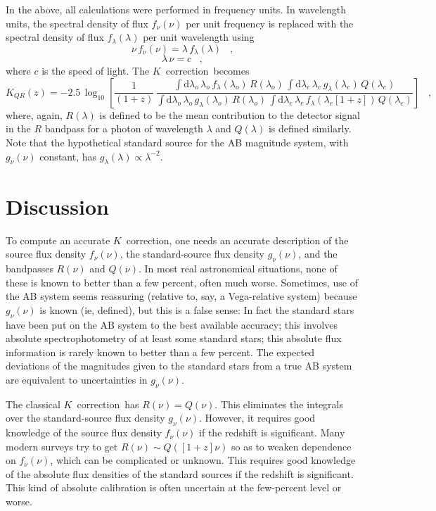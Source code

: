 \documentclass[preprint]{aastex}
\newcommand{\kcorrection}{$K$~correction}
\newcommand{\lambdaobs}{\lambda_o}
\newcommand{\lambdaemit}{\lambda_e}
\begin{document}
In the above, all calculations were performed in frequency units.  In
wavelength units, the spectral density of flux $f_{\nu}(\nu)$ per unit
frequency is replaced with the spectral density of flux
$f_{\lambda}(\lambda)$ per unit wavelength using
\begin{equation}
\nu\,f_{\nu}(\nu) = \lambda\,f_{\lambda}(\lambda) \;\;\;,
\end{equation}
\begin{equation}
\lambda\,\nu = c \;\;\;,
\end{equation}
where $c$ is the speed of light.  The \kcorrection\ becomes
\begin{equation}
K_{QR}(z) = -2.5\,\log_{10}\left[\frac{1}{(1+z)}\,
  \frac{\displaystyle
  \int\mathrm{d}\lambdaobs\,\lambdaobs\,f_{\lambda}(\lambdaobs)\,R(\lambdaobs)\,
    \int\mathrm{d}\lambdaemit\,\lambdaemit\,
    g_{\lambda}(\lambdaemit)\,     Q(\lambdaemit)}
       {\displaystyle
  \int\mathrm{d}\lambdaobs\,\lambdaobs\,g_{\lambda}(\lambdaobs)\,R(\lambdaobs)\,
    \int\mathrm{d}\lambdaemit\,\lambdaemit\,
    f_{\lambda}(\lambdaemit[1+z])\,Q(\lambdaemit)}
\right] \;\;\;,
\end{equation}
where, again, $R(\lambda)$ is defined to be the mean contribution to
the detector signal in the $R$ bandpass for a photon of wavelength
$\lambda$ and $Q(\lambda)$ is defined similarly.  Note that the
hypothetical standard source for the AB magnitude system, with
$g_{\nu}(\nu)$ constant, has
$g_{\lambda}(\lambda)\propto\lambda^{-2}$.

\section{Discussion}

To compute an accurate \kcorrection, one needs an accurate description
of the source flux density $f_{\nu}(\nu)$, the standard-source flux
density $g_{\nu}(\nu)$, and the bandpasses $R(\nu)$ and $Q(\nu)$.  In
most real astronomical situations, none of these is known to better
than a few percent, often much worse.  Sometimes, use of the AB system
seems reassuring (relative to, say, a Vega-relative system) because
$g_{\nu}(\nu)$ is known (ie, defined), but this is a false sense: In
fact the standard stars have been put on the AB system to the best
available accuracy; this involves absolute spectrophotometry of at
least some standard stars; this absolute flux information is rarely
known to better than a few percent.  The expected deviations of the
magnitudes given to the standard stars from a true AB system are
equivalent to uncertainties in $g_{\nu}(\nu)$.

The classical \kcorrection\ has $R(\nu)=Q(\nu)$.  This eliminates the
integrals over the standard-source flux density $g_{\nu}(\nu)$.
However, it requires good knowledge of the source flux density
$f_{\nu}(\nu)$ if the redshift is significant.  Many modern surveys
try to get $R(\nu)\sim Q([1+z]\nu)$ so as to weaken dependence on
$f_{\nu}(\nu)$, which can be complicated or unknown.  This requires
good knowledge of the absolute flux densities of the standard sources
if the redshift is significant.  This kind of absolute calibration is
often uncertain at the few-percent level or worse.



\end{document}
